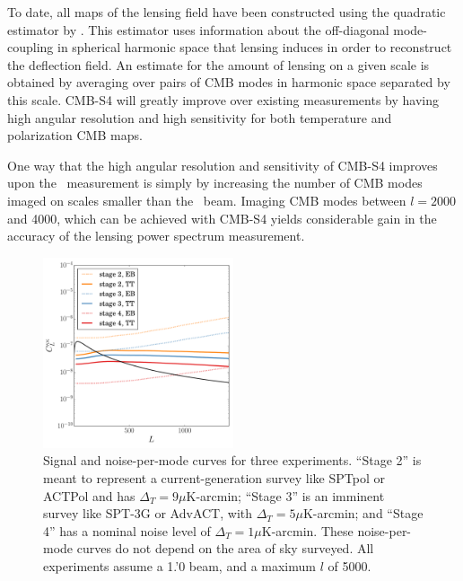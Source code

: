 To date, all maps of the lensing field have been constructed using the quadratic estimator by \cite{Hu:2001kj}.  This estimator uses information about the off-diagonal mode-coupling in spherical harmonic space that lensing induces in order to reconstruct the deflection field.  An estimate for the amount of lensing on a given scale is obtained by averaging over pairs of CMB modes in harmonic space separated by this scale. CMB-S4 will greatly improve over existing measurements by having high angular resolution and high sensitivity for both temperature and polarization CMB maps.

One way that the high angular resolution and sensitivity
of CMB-S4 improves upon the \planck\ measurement is simply
by increasing the number of CMB modes imaged on scales smaller than the \planck\ beam.  Imaging CMB modes between $l=2000$ and 4000, which can be achieved with CMB-S4 yields considerable gain in the accuracy of the lensing power spectrum measurement.

\begin{figure}[htbp]
\centering
\includegraphics[width=0.5\textwidth]{CMBLensing/n0s_s4.pdf}
\caption{Signal and noise-per-mode curves for three experiments. ``Stage 2'' is meant to represent a current-generation survey like SPTpol or ACTPol and has $\Delta_T = 9 \mu$K-arcmin; ``Stage 3'' is an imminent survey like SPT-3G or AdvACT, with $\Delta_T = 5 \mu$K-arcmin; and ``Stage 4'' has a nominal noise level of  $\Delta_T = 1 \mu$K-arcmin.   These noise-per-mode curves do not depend on the area of sky surveyed.  All experiments assume a 1.'0 beam, and a maximum $l$ of 5000.}  
\label{n0s_s4}
\end{figure}


